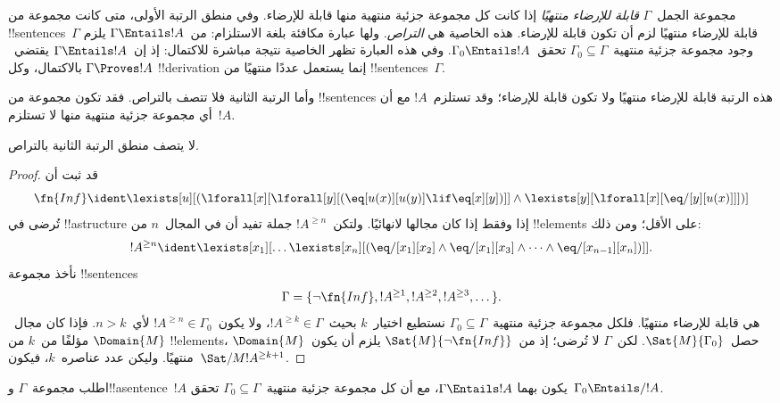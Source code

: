\documentclass[../../../include/open-logic-section]{subfiles}
\begin{document}


\begin{explain}
مجموعة الجمل~$\Gamma$ \emph{قابلة للإرضاء منتهيًا} إذا كانت
كل مجموعة جزئية منتهية منها قابلة للإرضاء.
وفي منطق الرتبة الأولى، متى كانت مجموعة من !!{sentence}s~$\Gamma$
قابلة للإرضاء منتهيًا لزم أن تكون قابلة للإرضاء.
هذه الخاصية هي \emph{التراص}. ولها عبارة مكافئة بلغة الاستلزام:
من~$\Gamma \Entails !A$ يلزم وجود مجموعة جزئية
منتهية~$\Gamma_0 \subseteq \Gamma$ تحقق~$\Gamma_0 \Entails !A$.
وفي هذه العبارة تظهر الخاصية نتيجة مباشرة للاكتمال:
إذ إن~$\Gamma \Entails !A$ يقتضي~$\Gamma \Proves !A$ بالاكتمال،
وكل !!{derivation} إنما يستعمل عددًا منتهيًا من
!!{sentence}s~$\Gamma$.

وأما الرتبة الثانية فلا تتصف بالتراص. فقد تكون مجموعة من
!!{sentence}s هذه الرتبة قابلة للإرضاء منتهيًا ولا تكون قابلة
للإرضاء؛ وقد تستلزم~$!A$ مع أن أي مجموعة جزئية منتهية منها
لا تستلزم~$!A$.
\end{explain}

\begin{thm}
لا يتصف منطق الرتبة الثانية بالتراص.
\end{thm}

\begin{proof}
قد ثبت أن
\[
\fn{Inf} \ident \lexists[u][(\lforall[x][\lforall[y][(\eq[u(x)][u(y)]
      \lif \eq[x][y])]] \land \lexists[y][\lforall[x][\eq/[y][u(x)]]])]
\]
تُرضى في !!a{structure} إذا وفقط إذا كان مجالها لانهائيًا.
ولتكن~$!A^{\ge n}$ جملة تفيد أن في المجال~$n$ من
!!{element}s على الأقل؛ ومن ذلك:
\[
!A^{\ge n} \ident \lexists[x_1][\dots\lexists[x_n][(\eq/[x_1][x_2]
    \land \eq/[x_1][x_3] \land \dots \land \eq/[x_{n-1}][x_n])]].
\]
نأخذ مجموعة !!{sentence}s
\[
\Gamma = \{\lnot \fn{Inf}, !A^{\ge 1}, !A^{\ge 2}, !A^{\ge 3}, \dots\}.
\]
هي قابلة للإرضاء منتهيًا. فلكل مجموعة جزئية منتهية~$\Gamma_0
\subseteq \Gamma$ نستطيع اختيار~$k$ بحيث~$!A^{\ge k} \in \Gamma$،
ولا يكون~$!A^{\ge n} \in \Gamma_0$ لأي~$n>k$.
فإذا كان مجال~$\Domain{M}$ مؤلفًا من~$k$ من !!{element}s،
حصل~$\Sat{M}{\Gamma_0}$.
لكن~$\Gamma$ لا تُرضى؛ إذ من~$\Sat{M}{\lnot \fn{Inf}}$
يلزم أن يكون~$\Domain{M}$ منتهيًا. وليكن عدد عناصره~$k$،
فيكون~$\Sat/{M}{!A^{\ge k+1}}$.
\end{proof}

\begin{prob}
اطلب مجموعة~$\Gamma$ و!!a{sentence}~$!A$ يكون بهما
$\Gamma \Entails !A$، مع أن كل مجموعة جزئية
منتهية~$\Gamma_0 \subseteq \Gamma$ تحقق~$\Gamma_0 \Entails/ !A$.
\end{prob}
\end{document}
